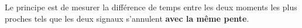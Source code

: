 \documentclass[../../main/main.tex]{subfiles}
\begin{document}

Le principe est de mesurer la différence de temps entre les deux moments les
plus proches tels que les deux signaux s'annulent \textbf{avec la même pente}.
\end{document}
